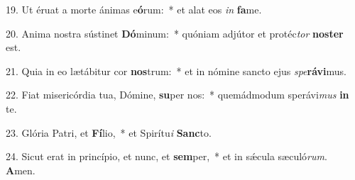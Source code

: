 19. Ut éruat a morte ánimas e\textbf{ó}rum:~*  et alat eos \textit{in} \textbf{fa}me.\

20. Anima nostra sústinet \textbf{Dó}minum:~*  quóniam adjútor et protéc\textit{tor} \textbf{nos}\textbf{ter} est.\

21. Quia in eo lætábitur cor \textbf{nos}trum:~*  et in nómine sancto ejus \textit{spe}\textbf{rá}\textbf{vi}mus.\

22. Fiat misericórdia tua, Dómine, \textbf{su}per nos:~*  quemádmodum sperávi\textit{mus} \textbf{in} te.\

23. Glória Patri, et \textbf{Fí}lio,~*  et Spirítu\textit{i} \textbf{Sanc}to.\

24. Sicut erat in princípio, et nunc, et \textbf{sem}per,~*  et in sǽcula sæculó\textit{rum}. \textbf{A}men.\

